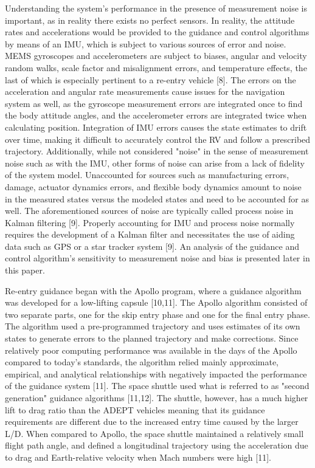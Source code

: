 \documentclass[12pt]{article}
\numberwithin{equation}{section}
\numberwithin{figure}{section}
\numberwithin{table}{section}
\begin{document}
Understanding the system's performance in the presence of measurement noise is important, as in reality there exists no perfect sensors. In reality, the attitude rates and accelerations would be provided to the guidance and control algorithms by means of an IMU, which is subject to various sources of error and noise. MEMS gyroscopes and accelerometers are subject to biases, angular and velocity random walks, scale factor and misalignment errors, and temperature effects, the last of which is especially pertinent to a re-entry vehicle [8]. The errors on the acceleration and angular rate measurements cause issues for the navigation system as well, as the gyroscope measurement errors are integrated once to find the body attitude angles, and the accelerometer errors are integrated twice when calculating position. Integration of IMU errors causes the state estimates to drift over time, making it difficult to accurately control the RV and follow a prescribed trajectory. Additionally, while not considered "noise" in the sense of measurement noise such as with the IMU, other forms of noise can arise from a lack of fidelity of the system model. Unaccounted for sources such as manufacturing errors, damage, actuator dynamics errors, and flexible body dynamics amount to noise in the measured states versus the modeled states and need to be accounted for as well. The aforementioned sources of noise are typically called process noise in Kalman filtering [9]. Properly accounting for IMU and process noise normally requires the development of a Kalman filter and necessitates the use of aiding data such as GPS or a star tracker system [9]. An analysis of the guidance and control algorithm's sensitivity to measurement noise and bias is presented later in this paper.

Re-entry guidance began with the Apollo program, where a guidance algorithm was developed for a low-lifting capsule [10,11]. The Apollo algorithm consisted of two separate parts, one for the skip entry phase and one for the final entry phase. The algorithm used a pre-programmed trajectory and uses estimates of its own states to generate errors to the planned trajectory and make corrections. Since relatively poor computing performance was available in the days of the Apollo compared to today's standards, the algorithm relied mainly approximate, empirical, and analytical relationships with negatively impacted the performance of the guidance system [11]. The space shuttle used what is referred to as "second generation" guidance algorithms [11,12]. The shuttle, however, has a much higher lift to drag ratio than the ADEPT vehicles meaning that its guidance requirements are different due to the increased entry time caused by the larger L/D. When compared to Apollo, the space shuttle maintained a relatively small flight path angle, and defined a longitudinal trajectory using the acceleration due to drag and Earth-relative velocity when Mach numbers were high [11].
\end{document}
